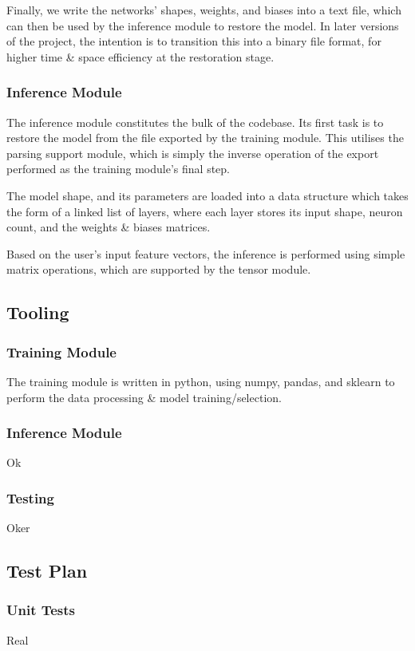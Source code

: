\documentclass[12pt]{article}
\begin{document}
Finally, we write the networks' shapes, weights, and biases into a text file, which can then be used by the inference module to restore the model. In later versions of the project, the intention is to transition this into a binary file format, for higher time \& space efficiency at the restoration stage.

\subsubsection{Inference Module}
The inference module constitutes the bulk of the codebase. Its first task is to restore the model from the file exported by the training module. This utilises the parsing support module, which is simply the inverse operation of the export performed as the training module's final step.\bigskip

The model shape, and its parameters are loaded into a data structure which takes the form of a linked list of layers, where each layer stores its input shape, neuron count, and the weights \& biases matrices.\bigskip

Based on the user's input feature vectors, the inference is performed using simple matrix operations, which are supported by the tensor module. 

\subsection{Tooling}
\subsubsection{Training Module}
The training module is written in python, using numpy, pandas, and sklearn to perform the data processing \& model training/selection.\bigskip

\subsubsection{Inference Module}
Ok

\subsubsection{Testing}
Oker

\subsection{Test Plan}
\subsubsection{Unit Tests}
Real
\end{document}
